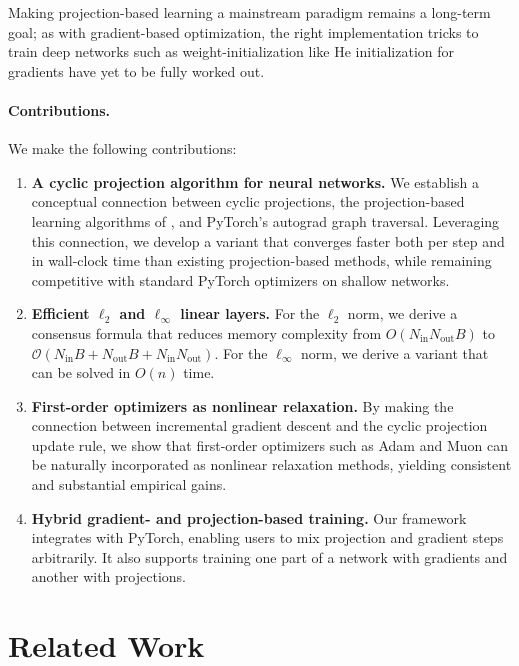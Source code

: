 \documentclass{article}
\theoremstyle{plain}
\theoremstyle{definition}
\theoremstyle{remark}
\begin{document}
Making projection-based learning a mainstream paradigm remains a long-term goal; as with gradient-based 
optimization, the right implementation tricks to train deep networks such as weight-initialization like He initialization \cite{delving} for gradients have yet to be fully worked out.


\paragraph{Contributions.} We make the following contributions:
\begin{enumerate}
    \item \textbf{A cyclic projection algorithm for neural networks.}
    We establish a conceptual connection between cyclic projections, the projection-based learning algorithms of
    \cite{elser2019learning,bergmeister2025projection}, and PyTorch's autograd graph traversal. Leveraging this connection, we develop a variant that converges faster both per step and in wall-clock time than existing projection-based methods, while remaining competitive with standard PyTorch optimizers on shallow networks.

    \item \textbf{Efficient $\ell_2$ and $\ell_\infty$ linear layers.}
    For the $\ell_2$ norm, we derive a consensus formula that reduces memory complexity from  $O(N_{\mathrm{in}}N_{\mathrm{out}}B)$ to $\mathcal{O}(N_{\mathrm{in}}B + N_{\mathrm{out}}B +N_{\mathrm{in}}N_{\mathrm{out}})$. For the $\ell_\infty$ norm, we derive a variant that can be solved in $O(n)$ time.

    \item \textbf{First-order optimizers as nonlinear relaxation.}
    By making the connection between incremental gradient descent and the cyclic projection update rule, we show that first-order optimizers such as Adam and Muon can be naturally incorporated as nonlinear relaxation methods, yielding consistent and substantial empirical gains.

    \item \textbf{Hybrid gradient- and projection-based training.}
    Our framework integrates with PyTorch, enabling users to mix projection and gradient steps arbitrarily. It also supports training one part of a network with gradients and another with projections.
\end{enumerate}


\section{Related Work}
\end{document}
